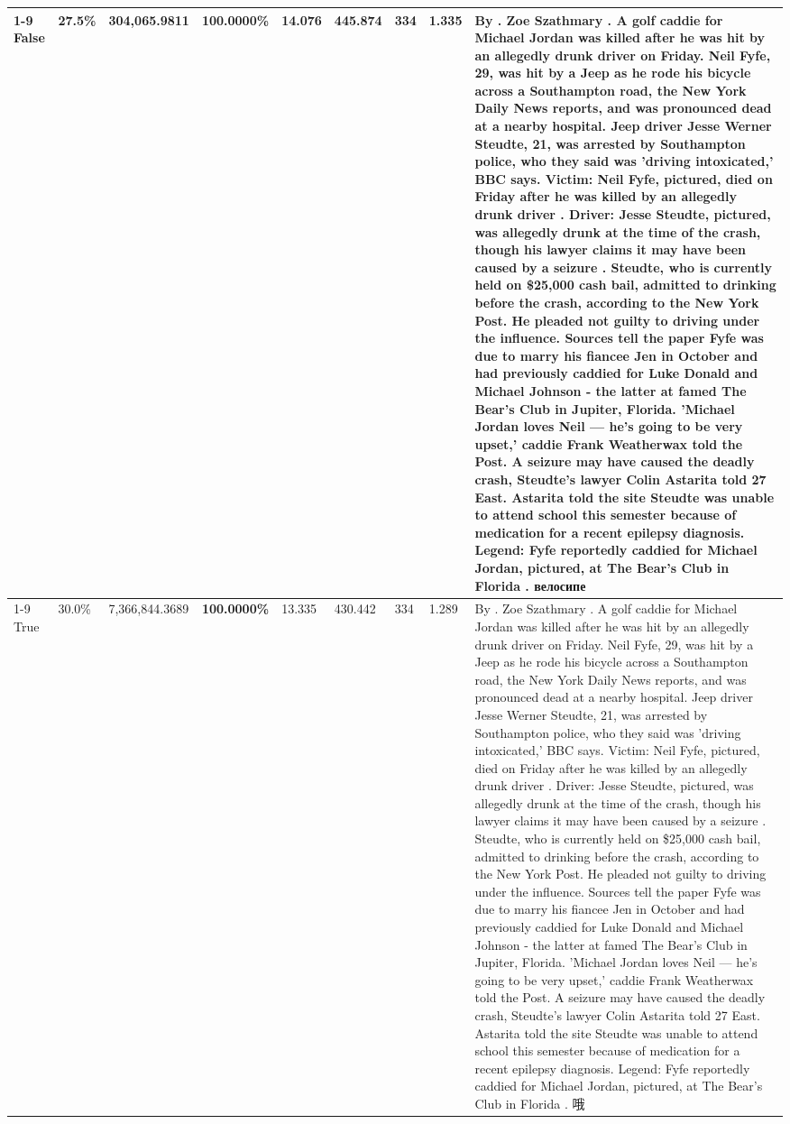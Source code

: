\begin{table}[H]
\begin{tabular}{lllrlllll}
\cline{1-9}
False & 27.5\% & 304,065.9811 & \bfseries \color{red} 100.0000\% & 14.076 & 445.874 & 334 & 1.335 & By . Zoe Szathmary . A golf caddie for Michael Jordan was killed after he was hit by an allegedly drunk driver on Friday. Neil Fyfe, 29, was hit by a Jeep as he rode his bicycle across a Southampton road, the New York Daily News reports, and was pronounced dead at a nearby hospital. Jeep driver Jesse Werner Steudte, 21, was arrested by Southampton police, who they said was 'driving intoxicated,' BBC says. Victim: Neil Fyfe, pictured, died on Friday after he was killed by an allegedly drunk driver . Driver: Jesse Steudte, pictured, was allegedly drunk at the time of the crash, though his lawyer claims it may have been caused by a seizure . Steudte, who is currently held on \$25,000 cash bail, admitted to drinking before the crash, according to the New York Post. He pleaded not guilty to driving under the influence. Sources tell the paper Fyfe was due to marry his fiancee Jen in October and had previously caddied for Luke Donald and Michael Johnson - the latter at famed The Bear's Club in Jupiter, Florida. 'Michael Jordan loves Neil — he’s going to be very upset,' caddie Frank Weatherwax told the Post. A seizure may have caused the deadly crash, Steudte's lawyer Colin Astarita told 27 East. Astarita told the site Steudte was unable to attend school this semester because of medication for a recent epilepsy diagnosis. Legend: Fyfe reportedly caddied for Michael Jordan, pictured, at The Bear's Club in Florida . велосипе \\
\cline{1-9}
True & 30.0\% & 7,366,844.3689 & \bfseries \color{red} 100.0000\% & 13.335 & 430.442 & 334 & 1.289 & By . Zoe Szathmary . A golf caddie for Michael Jordan was killed after he was hit by an allegedly drunk driver on Friday. Neil Fyfe, 29, was hit by a Jeep as he rode his bicycle across a Southampton road, the New York Daily News reports, and was pronounced dead at a nearby hospital. Jeep driver Jesse Werner Steudte, 21, was arrested by Southampton police, who they said was 'driving intoxicated,' BBC says. Victim: Neil Fyfe, pictured, died on Friday after he was killed by an allegedly drunk driver . Driver: Jesse Steudte, pictured, was allegedly drunk at the time of the crash, though his lawyer claims it may have been caused by a seizure . Steudte, who is currently held on \$25,000 cash bail, admitted to drinking before the crash, according to the New York Post. He pleaded not guilty to driving under the influence. Sources tell the paper Fyfe was due to marry his fiancee Jen in October and had previously caddied for Luke Donald and Michael Johnson - the latter at famed The Bear's Club in Jupiter, Florida. 'Michael Jordan loves Neil — he’s going to be very upset,' caddie Frank Weatherwax told the Post. A seizure may have caused the deadly crash, Steudte's lawyer Colin Astarita told 27 East. Astarita told the site Steudte was unable to attend school this semester because of medication for a recent epilepsy diagnosis. Legend: Fyfe reportedly caddied for Michael Jordan, pictured, at The Bear's Club in Florida . 哦 \\

\end{tabular}
\end{table}
